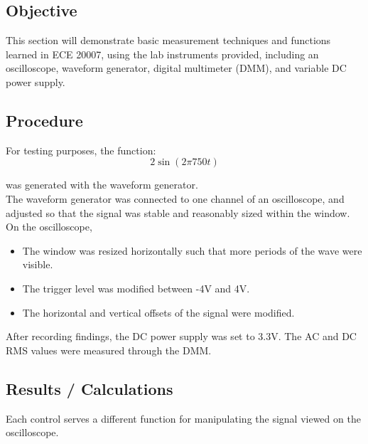 \documentclass[notitlepage, 12pt]{report}  %
\begin{document}
\subsection*{Objective}
\indent\indent This section will demonstrate basic measurement techniques and functions learned in ECE 20007, using 
the lab instruments provided, including an oscilloscope, waveform generator, digital multimeter (DMM), 
and variable DC power supply. 

\subsection*{Procedure}
\indent\indent For testing purposes, the function:
\begin{equation}
    2 \sin(2\pi 750t)
\end{equation}

was generated with the waveform generator.\\

The waveform generator was connected to one channel of an oscilloscope, and adjusted so that the signal 
was stable and reasonably sized within the window.\\


\noindent On the oscilloscope, 

\begin{itemize} %

    \item{The window was resized horizontally such that more periods of the wave were visible.}

    \item{The trigger level was modified between -4V and 4V.}

    \item{The horizontal and vertical offsets of the signal were modified.}
    
\end{itemize}

After recording findings, the DC power supply was set to 3.3V. The AC and DC RMS values were measured through 
the DMM.\\


\subsection*{Results / Calculations}

\indent\indent Each control serves a different function for manipulating the signal viewed on the oscilloscope. \\
\end{document}
